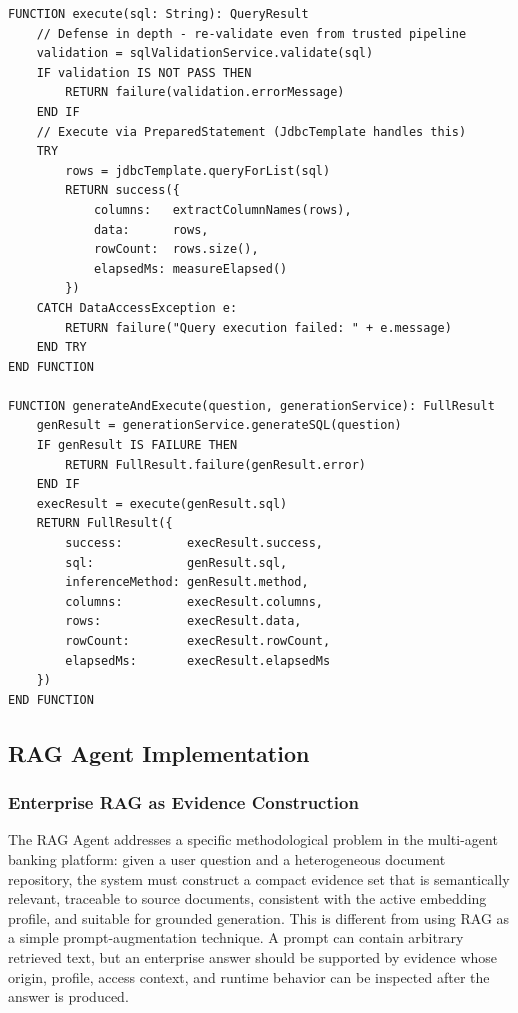 \begin{table}[H]
\small\singlespacing
\centering
\caption{Pseudocode --- SqlExecutionService Defense-in-Depth SQL Execution}
\label{tab:pseudocode-sql-execution}
\vspace{2mm}

\begin{lstlisting}
FUNCTION execute(sql: String): QueryResult
    // Defense in depth - re-validate even from trusted pipeline
    validation = sqlValidationService.validate(sql)
    IF validation IS NOT PASS THEN
        RETURN failure(validation.errorMessage)
    END IF
    // Execute via PreparedStatement (JdbcTemplate handles this)
    TRY
        rows = jdbcTemplate.queryForList(sql)
        RETURN success({
            columns:   extractColumnNames(rows),
            data:      rows,
            rowCount:  rows.size(),
            elapsedMs: measureElapsed()
        })
    CATCH DataAccessException e:
        RETURN failure("Query execution failed: " + e.message)
    END TRY
END FUNCTION

FUNCTION generateAndExecute(question, generationService): FullResult
    genResult = generationService.generateSQL(question)
    IF genResult IS FAILURE THEN
        RETURN FullResult.failure(genResult.error)
    END IF
    execResult = execute(genResult.sql)
    RETURN FullResult({
        success:         execResult.success,
        sql:             genResult.sql,
        inferenceMethod: genResult.method,
        columns:         execResult.columns,
        rows:            execResult.data,
        rowCount:        execResult.rowCount,
        elapsedMs:       execResult.elapsedMs
    })
END FUNCTION
\end{lstlisting}
\end{table}


\subsection{RAG Agent Implementation}

\subsubsection{Enterprise RAG as Evidence Construction}

The RAG Agent addresses a specific methodological problem in the multi-agent banking platform: given a user question and a heterogeneous document repository, the system must construct a compact evidence set that is semantically relevant, traceable to source documents, consistent with the active embedding profile, and suitable for grounded generation. This is different from using RAG as a simple prompt-augmentation technique. A prompt can contain arbitrary retrieved text, but an enterprise answer should be supported by evidence whose origin, profile, access context, and runtime behavior can be inspected after the answer is produced.

